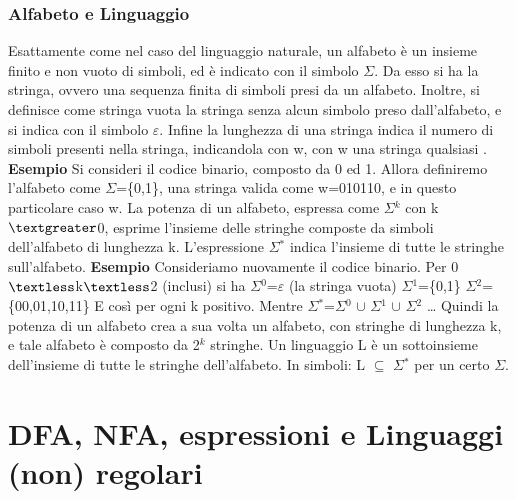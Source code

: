 \documentclass[]{article}
\begin{document}
\subsubsection{Alfabeto e Linguaggio}
Esattamente come nel caso del linguaggio naturale, un alfabeto è un insieme finito e non vuoto di simboli, ed è indicato con il simbolo $\Sigma$. Da esso si ha la stringa, ovvero una sequenza finita di simboli presi da un alfabeto. Inoltre, si definisce come stringa vuota la stringa senza alcun simbolo preso dall'alfabeto, e si indica con il simbolo $\varepsilon$. Infine la lunghezza di una stringa indica il numero di simboli presenti nella stringa, indicandola con \textbar w\textbar, con w una stringa qualsiasi .
\newline
\newline
\textbf{Esempio}
Si consideri il codice binario, composto da 0 ed 1. Allora definiremo l'alfabeto come $\Sigma$=\{0,1\}, una stringa valida come w=010110, e in questo particolare caso \textbar w.
\newline
\newline
La potenza di un alfabeto, espressa come $\Sigma$$^k$ con k$\textgreater$0, esprime l'insieme delle stringhe composte da simboli dell'alfabeto di lunghezza k. L'espressione $\Sigma$$^*$ indica l'insieme di tutte le stringhe sull'alfabeto.
\newline
\newline
\textbf{Esempio}
Consideriamo nuovamente il codice binario. Per 0$\textless$k$\textless$2 (inclusi) si ha \newline
$\Sigma$$^0$=$\varepsilon$ (la stringa vuota) \newline
$\Sigma$$^1$=\{0,1\}\newline
$\Sigma$$^2$=\{00,01,10,11\} \newline
E così per ogni k positivo. Mentre $\Sigma$$^*$=$\Sigma$$^0$ $\cup$ $\Sigma$$^1$ $\cup$ $\Sigma$$^2$ \ldots \newline \newline 
Quindi la potenza di un alfabeto crea a sua volta un alfabeto, con stringhe di lunghezza k, e tale alfabeto è composto da 2$^k$ stringhe. 
\newline
\newline
Un linguaggio L è un sottoinsieme dell'insieme di tutte le stringhe dell'alfabeto. In simboli: L $\subseteq$ $\Sigma$$^*$ per un certo $\Sigma$.
\section{DFA, NFA, espressioni e Linguaggi (non) regolari}
\end{document}
